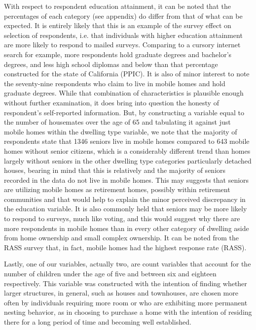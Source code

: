 \documentclass{article}
\begin{document}
	With respect to respondent education attainment, it can be noted that the percentages of each category (see appendix) do differ from that of what can be expected.  It is entirely likely that this is an example of the survey effect on selection of respondents, i.e. that individuals with higher education attainment are more likely to respond to mailed surveys.  Comparing to a cursory internet search for example, more respondents hold graduate degrees and bachelor’s degrees, and less high school diplomas and below than that percentage constructed for the state of California (PPIC).  It is also of minor interest to note the seventy-nine respondents who claim to live in mobile homes and hold graduate degrees.  While that combination of characteristics is plausible enough without further examination, it does bring into question the honesty of respondent’s self-reported information.  But, by constructing a variable equal to the number of housemates over the age of 65 and tabulating it against just mobile homes within the dwelling type variable, we note that the majority of respondents state that 1346 seniors live in mobile homes compared to 643 mobile homes without senior citizens, which is a considerably different trend than homes largely without seniors in the other dwelling type categories particularly detached houses, bearing in mind that this is relatively and the majority of seniors recorded in the data do not live in mobile homes. This may suggests that seniors are utilizing mobile homes as retirement homes, possibly within retirement communities and that would help to explain the minor perceived discrepancy in the education variable.  It is also commonly held that seniors may be more likely to respond to surveys, much like voting, and this would suggest why there are more respondents in mobile homes than in every other category of dwelling aside from home ownership and small complex ownership.  It can be noted from the RASS survey that, in fact, mobile homes had the highest response rate (RASS).
	
Lastly, one of our variables, actually two, are count variables that account for the number of children under the age of five and between six and eighteen respectively.  This variable was constructed with the intention of finding whether larger structures, in general, such as houses and townhouses, are chosen more often by individuals requiring more room or who are exhibiting more permanent nesting behavior, as in choosing to purchase a home with the intention of residing there for a long period of time and becoming well established.
\end{document}
